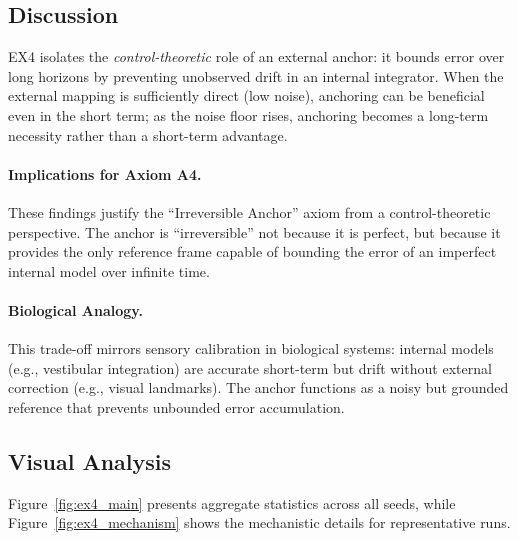 \documentclass{article}
\begin{document}
\subsection{Discussion}

EX4 isolates the \emph{control-theoretic} role of an external anchor: it bounds error over long horizons by preventing unobserved drift in an internal integrator.
When the external mapping is sufficiently direct (low noise), anchoring can be beneficial even in the short term; as the noise floor rises, anchoring becomes a long-term necessity rather than a short-term advantage.

\paragraph{Implications for Axiom A4.}
These findings justify the ``Irreversible Anchor'' axiom from a control-theoretic perspective. The anchor is ``irreversible'' not because it is perfect, but because it provides the only reference frame capable of bounding the error of an imperfect internal model over infinite time.

\paragraph{Biological Analogy.}
This trade-off mirrors sensory calibration in biological systems: internal models (e.g., vestibular integration) are accurate short-term but drift without external correction (e.g., visual landmarks). The anchor functions as a noisy but grounded reference that prevents unbounded error accumulation.

\subsection{Visual Analysis}

Figure~\ref{fig:ex4_main} presents aggregate statistics across all seeds, while Figure~\ref{fig:ex4_mechanism} shows the mechanistic details for representative runs.
\end{document}
